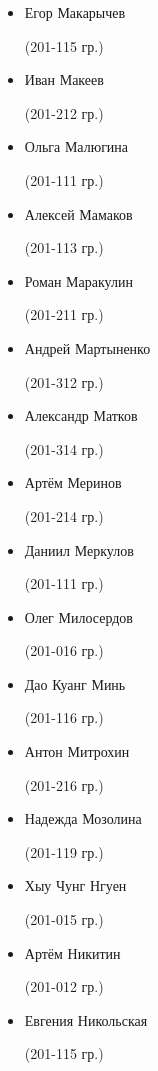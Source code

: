 \begin{multicols}{2}
\begin{small}
\begin{itemize}[leftmargin=*]
	\item[] Егор Макарычев\begin{tiny} (201-115 гр.)\end{tiny}
	\item[] Иван Макеев\begin{tiny} (201-212 гр.)\end{tiny}
	\item[] Ольга Малюгина\begin{tiny} (201-111 гр.)\end{tiny}
	\item[] Алексей Мамаков\begin{tiny} (201-113 гр.)\end{tiny} %
	\item[] Роман Маракулин\begin{tiny} (201-211 гр.)\end{tiny}
	\item[] Андрей Мартыненко\begin{tiny} (201-312 гр.)\end{tiny}
	\item[] Александр Матков\begin{tiny} (201-314 гр.)\end{tiny} %
	\item[] Артём Меринов\begin{tiny} (201-214 гр.)\end{tiny}
	\item[] Даниил Меркулов\begin{tiny} (201-111 гр.)\end{tiny}
	\item[] Олег Милосердов\begin{tiny} (201-016 гр.)\end{tiny}
	\item[] Дао Куанг Минь\begin{tiny} (201-116 гр.)\end{tiny}
	\item[] Антон Митрохин\begin{tiny} (201-216 гр.)\end{tiny}
	\item[] Надежда Мозолина\begin{tiny} (201-119 гр.)\end{tiny}

	\item[] Хыу Чунг Нгуен\begin{tiny} (201-015 гр.)\end{tiny} %
	\item[] Артём Никитин\begin{tiny} (201-012 гр.)\end{tiny}
	\item[] Евгения Никольская\begin{tiny} (201-115 гр.)\end{tiny} %


\end{itemize}
\end{small}
\end{multicols}
